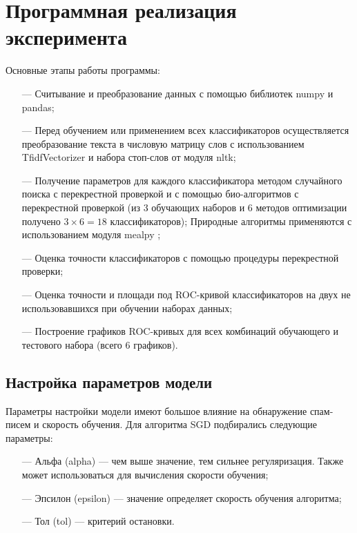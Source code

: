 \section{Программная реализация эксперимента}

Основные этапы работы программы:

\begin{itemize}
    \item[—] Считывание и преобразование данных с помощью библиотек numpy и pandas;
    \item[—] Перед обучением или применением всех классификаторов осуществляется преобразование текста в 
    числовую матрицу слов с использованием \\TfidfVectorizer\cite{scikitTfIdf} и набора стоп-слов от модуля nltk;
    \item[—] Получение параметров для каждого классификатора методом случайного поиска с перекрестной 
    проверкой и с помощью био-алгоритмов с перекрестной проверкой (из 3 обучающих наборов и 6 методов оптимизации получено $3 \times 6 = 18$ классификаторов);
    Природные алгоритмы применяются с использованием модуля mealpy \cite{thieu_nguyen_2020_3711949};
    \item[—] Оценка точности классификаторов с помощью процедуры перекрестной проверки;
    \item[—] Оценка точности и площади под ROC-кривой классификаторов на двух не использовавшихся при обучении наборах данных;
    \item[—] Построение графиков ROC-кривых для всех комбинаций обучающего и тестового набора (всего 6 графиков).
\end{itemize}

\subsection{Настройка параметров модели}

Параметры настройки модели имеют большое влияние на обнаружение спам-писем и скорость обучения. Для алгоритма SGD 
подбирались следующие параметры:

\begin{itemize}
    \item[—] Альфа (alpha) — чем выше значение, тем сильнее регуляризация. Также может использоваться для вычисления скорости обучения;
    \item[—] Эпсилон (epsilon) — значение определяет скорость обучения алгоритма;
    \item[—] Тол (tol) — критерий остановки.
\end{itemize}

